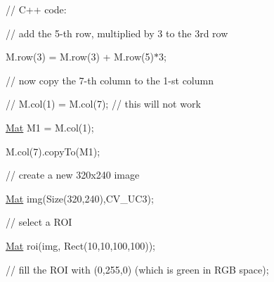 {\ttfamily }

{\ttfamily }

{\ttfamily }

{\ttfamily // C++ code\+:}

{\ttfamily }

{\ttfamily }

{\ttfamily // add the 5-\/th row, multiplied by 3 to the 3rd row}

{\ttfamily }

{\ttfamily }

{\ttfamily M.\+row(3) = M.\+row(3) + M.\+row(5)$\ast$3;}

{\ttfamily }

{\ttfamily }

{\ttfamily // now copy the 7-\/th column to the 1-\/st column}

{\ttfamily }

{\ttfamily }

{\ttfamily // M.\+col(1) = M.\+col(7); // this will not work}

{\ttfamily }

{\ttfamily }

{\ttfamily \mbox{\hyperlink{classorg_1_1opencv_1_1core_1_1_mat}{Mat}} M1 = M.\+col(1);}

{\ttfamily }

{\ttfamily }

{\ttfamily M.\+col(7).copy\+To(\+M1);}

{\ttfamily }

{\ttfamily }

{\ttfamily // create a new 320x240 image}

{\ttfamily }

{\ttfamily }

{\ttfamily \mbox{\hyperlink{classorg_1_1opencv_1_1core_1_1_mat}{Mat}} img(\+Size(320,240),\+C\+V\+\_\+U\+C3);}

{\ttfamily }

{\ttfamily }

{\ttfamily // select a R\+OI}

{\ttfamily }

{\ttfamily }

{\ttfamily \mbox{\hyperlink{classorg_1_1opencv_1_1core_1_1_mat}{Mat}} roi(img, Rect(10,10,100,100));}

{\ttfamily }

{\ttfamily }

{\ttfamily // fill the R\+OI with (0,255,0) (which is green in R\+GB space);}

